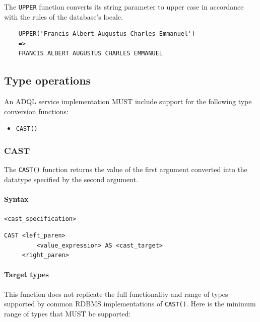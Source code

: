 \documentclass[11pt,a4paper]{ivoa}
\begin{document}
The \texttt{UPPER} function converts its string parameter to upper case in
accordance with the rules of the database's locale.

\begin{verbatim}
    UPPER('Francis Albert Augustus Charles Emmanuel')
    =>
    FRANCIS ALBERT AUGUSTUS CHARLES EMMANUEL
\end{verbatim}

\subsection{Type operations}
\label{sec:type}

An ADQL service implementation MUST include support for the following
type conversion functions:

\begin{itemize}
    \item \verb:CAST():
\end{itemize}

\subsubsection{CAST}
\label{sec:type.cast}

The \verb:CAST(): function returns the value of the first argument converted
into the datatype specified by the second argument.

\paragraph{Syntax} \verb:<cast_specification>:
\begin{verbatim}
CAST <left_paren>
         <value_expression> AS <cast_target>
     <right_paren>
\end{verbatim}

\paragraph{Target types}

This function does not replicate the full functionality and range of types
supported by common RDBMS implementations of \verb:CAST():. Here is the minimum
range of types that MUST be supported:
\end{document}
